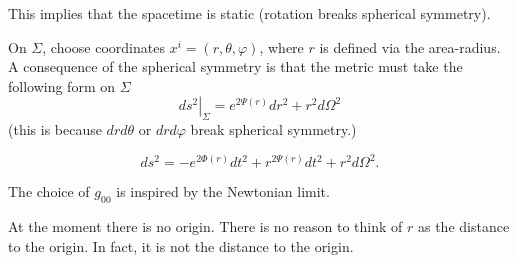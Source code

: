 \begin{claim}
  This implies that the spacetime is static (rotation breaks spherical symmetry).
\end{claim}

On $\Sigma$, choose coordinates $x^{i} = (r, \theta, \varphi)$, where $r$ is defined via the area-radius.
A consequence of the spherical symmetry is that the metric must take the following form on $\Sigma$
\begin{equation}
  \left.ds^2 \right\rvert_{\Sigma} = e^{2\Psi(r)} dr^2 + r^2 d\Omega^2
\end{equation}
(this is because $dr d\theta$ or $dr d\varphi$ break spherical symmetry.)

\begin{equation}
  ds^2 = -e^{2 \Phi(r)} dt^2 + r^{2 \Psi(r)} dt^2 + r^2 d\Omega^2.
\end{equation}
\begin{leftbar}
  The choice of $g_{00}$ is inspired by the Newtonian limit.
\end{leftbar}
\begin{leftbar}
  At the moment there is no origin. There is no reason to think of $r$ as the distance to the origin. In fact, it is not the distance to the origin.
\end{leftbar}
